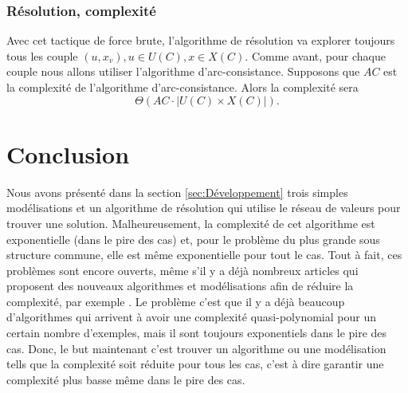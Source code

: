\documentclass[french]{article}
\theoremstyle{definition}
\theoremstyle{remark}
\begin{document}
\subsubsection{Résolution, complexité}
Avec cet tactique de force brute, l'algorithme de résolution va explorer toujours tous les couple $(u, x_v), u \in U(C), x \in X(C)$. Comme avant, pour chaque couple nous allons utiliser l'algorithme d'arc-consistance. Supposons que $AC$ est la complexité de l'algorithme d'arc-consistance.  
Alors la complexité sera $$\Theta(AC \cdot |U(C) \times X(C)|).$$ 



\newpage
\section{Conclusion}
\label{sec:conc}
Nous avons présenté dans la section \ref{sec:Développement} trois simples modélisations et un algorithme de résolution qui utilise le réseau de valeurs pour trouver une solution. Malheureusement, la complexité de cet algorithme est exponentielle (dans le pire des cas) et, pour le problème du plus grande sous structure commune, elle est même exponentielle pour tout le cas. Tout à fait, ces problèmes sont encore ouverts, même s'il y a déjà nombreux articles qui proposent des nouveaux algorithmes et modélisations afin de réduire la complexité, par exemple \cite{SorlinS082010,SorlinS08, TakapouiB16}. Le problème c'est que il y a déjà beaucoup d'algorithmes qui arrivent à avoir une complexité quasi-polynomial pour un certain nombre d'exemples, mais il sont toujours exponentiels dans le pire des cas. Donc, le but maintenant c'est trouver un algorithme ou une modélisation tells que la complexité soit réduite pour tous les cas, c'est à dire garantir une complexité plus basse même dans le pire des cas.



\newpage


\end{document}
